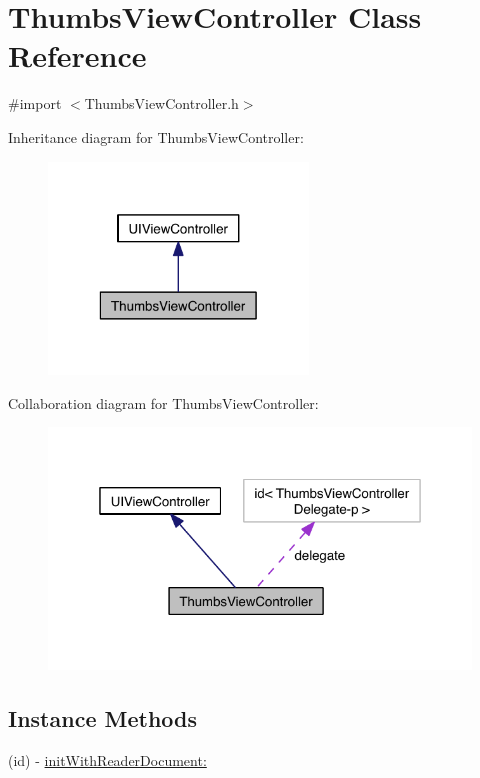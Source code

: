 \hypertarget{interface_thumbs_view_controller}{\section{Thumbs\-View\-Controller Class Reference}
\label{d7/d57/interface_thumbs_view_controller}
}


{\ttfamily \#import $<$Thumbs\-View\-Controller.\-h$>$}



Inheritance diagram for Thumbs\-View\-Controller\-:
\nopagebreak
\begin{figure}[H]
\begin{center}
\leavevmode
\includegraphics[width=196pt]{df/dec/interface_thumbs_view_controller__inherit__graph}
\end{center}
\end{figure}


Collaboration diagram for Thumbs\-View\-Controller\-:
\nopagebreak
\begin{figure}[H]
\begin{center}
\leavevmode
\includegraphics[width=321pt]{df/dff/interface_thumbs_view_controller__coll__graph}
\end{center}
\end{figure}
\subsection*{Instance Methods}
\begin{DoxyCompactItemize}
\item 
(id) -\/ \hyperlink{interface_thumbs_view_controller_af9aab69c12fd6e29af00d55e2fcecb9a}{init\-With\-Reader\-Document\-:}
\end{DoxyCompactItemize}
